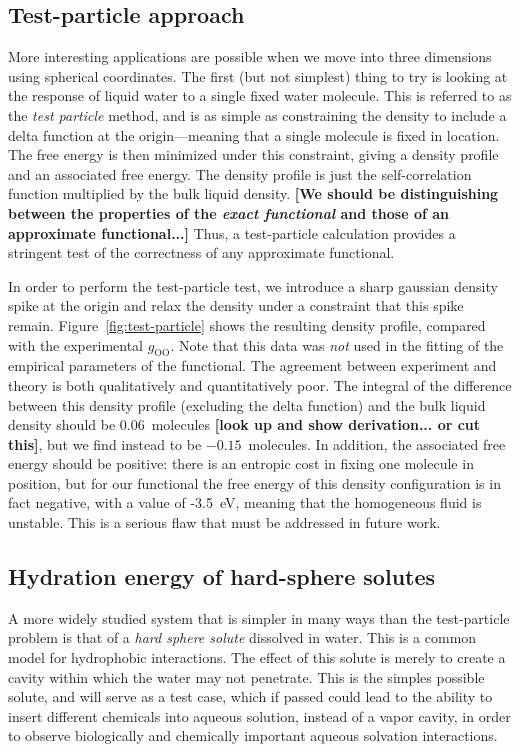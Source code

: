 \documentclass[letterpaper,twocolumn,amsmath,amssymb,prb]{revtex4-1}
\newcommand{\red}[1]{{\bf \color{red} #1}}
\newcommand{\fixme}[1]{\red{[#1]}}
\begin{document}
\subsection{Test-particle approach}

More interesting applications are possible when we move into three
dimensions using spherical coordinates.  The first (but not simplest)
thing to try is looking at the response of liquid water to a single
fixed water molecule.  This is referred to as the \emph{test particle}
method\cite{FIXME}, and is as simple as constraining the density to
include a delta function at the origin---meaning that a single
molecule is fixed in location.  The free energy is then minimized
under this constraint, giving a density profile and an associated free
energy.  The density profile is just the self-correlation function
multiplied by the bulk liquid density.  \fixme{We should be
  distinguishing between the properties of the \emph{exact functional}
  and those of an approximate functional...}  Thus, a test-particle
calculation provides a stringent test of the correctness of any
approximate functional.

In order to perform the test-particle test, we introduce a sharp
gaussian density spike at the origin and relax the density under a
constraint that this spike remain.  Figure~\ref{fig:test-particle}
shows the resulting density profile, compared with the experimental
$g_{\textrm{OO}}$.  Note that this data was \emph{not} used in the
fitting of the empirical parameters of the functional.  The agreement
between experiment and theory is both qualitatively and quantitatively
poor.  The integral of the difference between this density profile
(excluding the delta function) and the bulk liquid density should be
0.06~molecules \fixme{look up and show derivation... or cut this},
but we find instead to be $-0.15$~molecules.  In addition, the associated
free energy should be positive: there is an entropic cost in fixing
one molecule in position, but for our functional the free energy of
this density configuration is in fact negative, with a value of
-3.5~eV, meaning that the homogeneous fluid is unstable.  This is a
serious flaw that must be addressed in future work.

\subsection{Hydration energy of hard-sphere solutes}

A more widely studied system that is simpler in many ways than the
test-particle problem is that of a \emph{hard sphere solute} dissolved
in water.  This is a common model for hydrophobic interactions.  The
effect of this solute is merely to create a cavity within which the
water may not penetrate.  This is the simples possible solute, and
will serve as a test case, which if passed could lead to the ability
to insert different chemicals into aqueous solution, instead of a
vapor cavity, in order to observe biologically and chemically
important aqueous solvation interactions.
\end{document}
